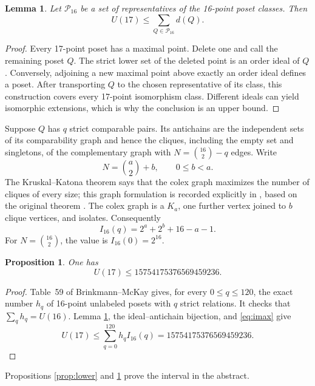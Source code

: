 \documentclass[11pt]{amsart}
\newtheorem{lemma}[theorem]{Lemma}
\newtheorem{proposition}[theorem]{Proposition}
\theoremstyle{definition}
\begin{document}
\begin{lemma}\label{lem:extension}
Let $\mathcal P_{16}$ be a set of representatives of the 16-point poset
classes.  Then
\[
U(17)\leq\sum_{Q\in\mathcal P_{16}}d(Q).
\]
\end{lemma}

\begin{proof}
Every 17-point poset has a maximal point.  Delete one and call the remaining
poset $Q$.  The strict lower set of the deleted point is an order ideal of
$Q$.  Conversely, adjoining a new maximal point above exactly an order ideal
defines a poset.  After transporting $Q$ to the chosen representative of its
class, this construction covers every 17-point isomorphism class.  Different
ideals can yield isomorphic extensions, which is why the conclusion is an
upper bound.
\end{proof}

Suppose $Q$ has $q$ strict comparable pairs.  Its antichains are the
independent sets of its comparability graph and hence the cliques, including
the empty set and singletons, of the complementary graph with
$N=\binom{16}{2}-q$ edges.  Write
\[
N=\binom{a}{2}+b,\qquad 0\leq b<a.
\]
The Kruskal--Katona theorem says that the colex graph maximizes the number of
cliques of every size; this graph formulation is recorded explicitly in
\cite[Proposition~1]{KirschRadcliffe2021}, based on the original theorem
\cite{Kruskal1963}.  The colex graph is a $K_a$, one further vertex joined to
$b$ clique vertices, and isolates.  Consequently
\begin{equation}\label{eq:imax}
I_{16}(q)=2^a+2^b+16-a-1.
\end{equation}
For $N=\binom{16}{2}$, the value is $I_{16}(0)=2^{16}$.

\begin{proposition}\label{prop:upper}
One has
\[
U(17)\leq15754175376569459236.
\]
\end{proposition}

\begin{proof}
Table~59 of Brinkmann--McKay \cite{BrinkmannMcKay2002} gives, for every
$0\leq q\leq120$, the exact number $h_q$ of 16-point unlabeled posets with
$q$ strict relations.  It checks that $\sum_q h_q=U(16)$.  Lemma
\ref{lem:extension}, the ideal--antichain bijection, and
\eqref{eq:imax} give
\[
U(17)\leq\sum_{q=0}^{120}h_q I_{16}(q)
=15754175376569459236.
\]
\end{proof}

Propositions \ref{prop:lower} and \ref{prop:upper} prove the interval in the
abstract.
\end{document}
